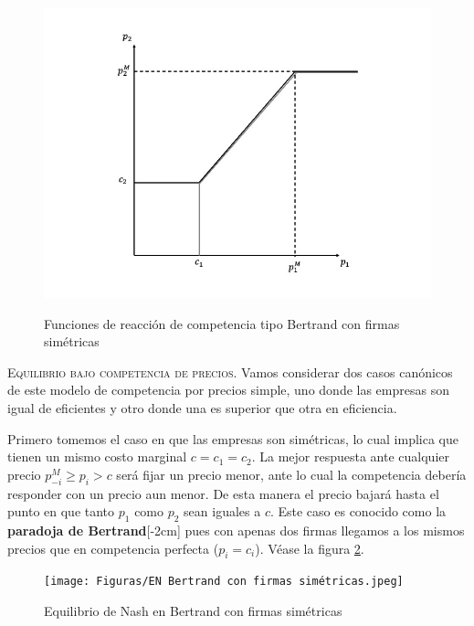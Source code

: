 \begin{figure}[htb]
    \centering
    \caption{Funciones de reacción de competencia tipo Bertrand con firmas simétricas}
    \includegraphics[width=15cm]{Figuras/Función de reacción Bertrand.jpeg}
    \label{fig:funciones de reacción Bertrand}
\end{figure}

\textsc{Equilibrio bajo competencia de precios}. Vamos considerar dos casos canónicos de este modelo de competencia por precios simple, uno donde las empresas son igual de eficientes y otro donde una es superior que otra en eficiencia.

Primero tomemos el caso en que las empresas son simétricas, lo cual implica que tienen un mismo costo marginal $c = c_1 = c_2$. La mejor respuesta ante cualquier precio $p_{-i}^M \geq p_i>c$ será fijar un precio menor, ante lo cual la competencia debería responder con un precio aun menor. De esta manera el precio bajará hasta el punto en que tanto $p_1$ como $p_2$ sean iguales a $c$. Este caso es conocido como la \textbf{paradoja de Bertrand}[-2cm] pues con apenas dos firmas llegamos a los mismos precios que en competencia perfecta ($p_i=c_i$). Véase la figura \ref{fig:EN Bertrand sim}. 

\begin{figure}[htb]
    \centering
    \caption{Equilibrio de Nash en Bertrand con firmas simétricas}
    \texttt{[image: Figuras/EN Bertrand con firmas simétricas.jpeg]}
    \label{fig:EN Bertrand sim}
\end{figure}

